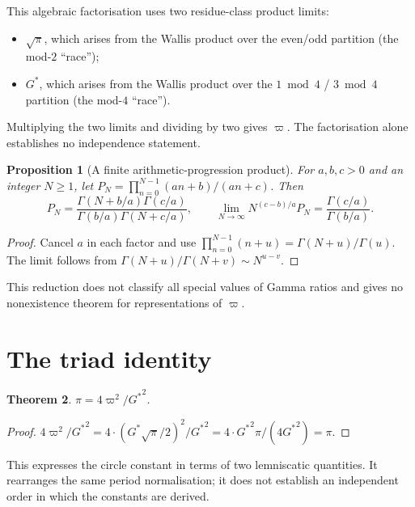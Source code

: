 \documentclass[12pt,reqno]{amsart}
\newtheorem{theorem}{Theorem}[section]
\newtheorem{proposition}[theorem]{Proposition}
\theoremstyle{definition}
\theoremstyle{remark}
\newcommand{\Gstar}{G^{\!*}}
\newcommand{\varpiup}{\varpi}
\begin{document}
This algebraic factorisation uses two residue-class product limits:
\begin{itemize}
  \item $\sqrt{\pi}$, which arises from the Wallis product over the
    even/odd partition (the mod-$2$ ``race'');
  \item $\Gstar$, which arises from the Wallis product over the
    $1\bmod 4$ / $3\bmod 4$ partition (the mod-$4$ ``race'').
\end{itemize}
Multiplying the two limits and dividing by two gives $\varpiup$.
The factorisation alone establishes no independence statement.

\begin{proposition}[A finite arithmetic-progression product]
\label{prop:no-third}
For $a,b,c>0$ and an integer $N\geq1$, let
$P_N=\prod_{n=0}^{N-1}(an+b)/(an+c)$. Then
\[
 P_N=\frac{\Gamma(N+b/a)\Gamma(c/a)}
 {\Gamma(b/a)\Gamma(N+c/a)},\qquad
 \lim_{N\to\infty}N^{(c-b)/a}P_N
 =\frac{\Gamma(c/a)}{\Gamma(b/a)}.
\]
\end{proposition}

\begin{proof}
Cancel $a$ in each factor and use
$\prod_{n=0}^{N-1}(n+u)=\Gamma(N+u)/\Gamma(u)$.
The limit follows from
$\Gamma(N+u)/\Gamma(N+v)\sim N^{u-v}$.
\end{proof}
This reduction does not classify all special values of Gamma ratios
and gives no nonexistence theorem for representations of $\varpiup$.


\section{The triad identity}

\begin{theorem}\label{thm:triad}
$\pi = 4\varpiup^{2}/{\Gstar}^{2}$.
\end{theorem}

\begin{proof}
$4\varpiup^{2}/{\Gstar}^{2}
= 4\cdot({\Gstar}\sqrt{\pi}/2)^{2}/{\Gstar}^{2}
= 4\cdot{\Gstar}^{2}\pi/(4{\Gstar}^{2}) = \pi$.
\end{proof}

This expresses the circle constant in terms of two lemniscatic
quantities. It rearranges the same period normalisation; it does not
establish an independent order in which the constants are derived.
\end{document}
